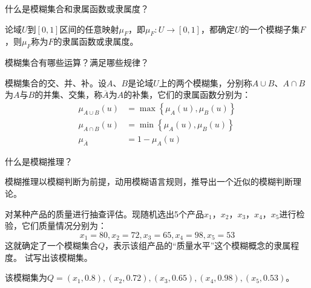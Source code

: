 \begin{question}
什么是模糊集合和隶属函数或隶属度？
\end{question}
\begin{solution}
论域$U$到$[0,1]$区间的任意映射$\mu_F$，即$\mu_F \colon U \to [0,1]$，都确定$U$的一个模糊子集$F$，则$\mu_F$称为$F$的隶属函数或隶属度。
\end{solution}

\begin{question}
模糊集合有哪些运算？满足哪些规律？
\end{question}
\begin{solution}
模糊集合的交、并、补。设$A$、$B$是论域$U$上的两个模糊集，分别称$A \cup B$、$A \cap B$为$A$与$B$的并集、交集，称$\overline{A}$为$A$的补集，它们的隶属函数分别为：
	\begin{align*}
		\mu_{A \cup B}(u) &= \max \left\{ \mu_A(u), \mu_B(u) \right\} \\
		\mu_{A \cap B}(u) &= \min \left\{ \mu_A(u), \mu_B(u) \right\} \\
		\mu_{\overline{A}} &= 1 - \mu_A(u)
	\end{align*}
\end{solution}

\begin{question}
什么是模糊推理？
\end{question}
\begin{solution}
模糊推理以模糊判断为前提，动用模糊语言规则，推导出一个近似的模糊判断理论。
\end{solution}

\begin{question}
对某种产品的质量进行抽查评估。现随机选出5个产品$x_1$，$x_2$，$x_3$，$x_4$，$x_5$进行检验，它们质量情况分别为：
\[ x_1=80, x_2=72, x_3=65, x_4=98, x_5=53\]
这就确定了一个模糊集合$Q$，表示该组产品的``质量水平''这个模糊概念的隶属程度。
试写出该模糊集。
\end{question}
\begin{solution}
该模糊集为$Q={(x_1,0.8), (x_2, 0.72), (x_3,0.65), (x_4,0.98), (x_5,0.53)}$。
\end{solution}


